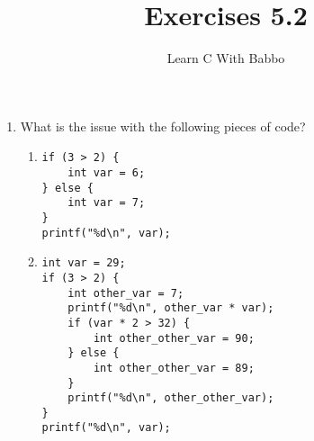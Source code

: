\documentclass{article}
\begin{document}
\title{Exercises 5.2}
\author{Learn C With Babbo}
\date{}
\maketitle

\begin{enumerate}
\item What is the issue with the following pieces of code?

\begin{enumerate}
\item
\begin{lstlisting}[style=CStyle]
if (3 > 2) {
    int var = 6;
} else {
    int var = 7;
}
printf("%d\n", var);
\end{lstlisting}

\item
\begin{lstlisting}[style=CStyle]
int var = 29;
if (3 > 2) {
    int other_var = 7;
    printf("%d\n", other_var * var);
    if (var * 2 > 32) {
        int other_other_var = 90;
    } else {
        int other_other_var = 89;
    }
    printf("%d\n", other_other_var);
}
printf("%d\n", var);
\end{lstlisting}
\end{enumerate}
\end{enumerate}
\end{document}
